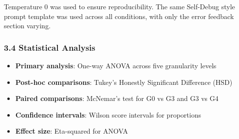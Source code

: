 Temperature 0 was used to ensure reproducibility. The same Self-Debug style prompt template was used across all conditions, with only the error feedback section varying.

\subsubsection{3.4 Statistical Analysis}

\begin{itemize}
\item \textbf{Primary analysis}: One-way ANOVA across five granularity levels
\item \textbf{Post-hoc comparisons}: Tukey's Honestly Significant Difference (HSD)
\item \textbf{Paired comparisons}: McNemar's test for G0 vs G3 and G3 vs G4
\item \textbf{Confidence intervals}: Wilson score intervals for proportions
\item \textbf{Effect size}: Eta-squared for ANOVA
\end{itemize}
